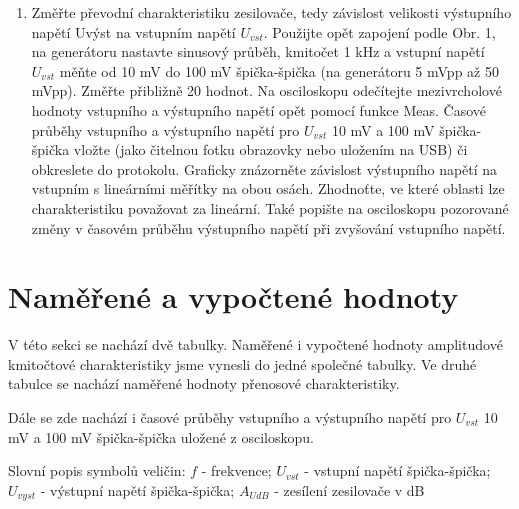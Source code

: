 \documentclass[a4paper, czech]{article}
\begin{document}
\begin{enumerate}
    \item Změřte převodní charakteristiku zesilovače, tedy závislost velikosti výstupního napětí Uvýst na vstupním napětí $U_{vst}$. Použijte opět zapojení podle Obr. 1, na generátoru nastavte sinusový průběh, kmitočet 1 kHz a vstupní napětí $U_{vst}$ měňte od 10 mV do 100 mV špička-špička (na generátoru 5 mVpp až 50 mVpp). Změřte přibližně 20 hodnot. Na osciloskopu odečítejte mezivrcholové hodnoty vstupního a výstupního napětí opět pomocí funkce Meas. Časové průběhy vstupního a výstupního napětí pro $U_{vst}$ 10 mV a 100 mV špička-špička vložte (jako čitelnou fotku obrazovky nebo uložením na USB) či obkreslete do protokolu. Graficky znázorněte závislost výstupního napětí na vstupním s lineárními měřítky na obou osách. Zhodnoťte, ve které oblasti lze charakteristiku považovat za lineární. Také popište na osciloskopu pozorované změny v časovém průběhu výstupního napětí při zvyšování vstupního napětí.
\end{enumerate}

\section{Naměřené a vypočtené hodnoty}

V této sekci se nachází dvě tabulky.
Naměřené i vypočtené hodnoty amplitudové kmitočtové charakteristiky jsme vynesli do jedné společné tabulky.
Ve druhé tabulce se nachází naměřené hodnoty přenosové charakteristiky.

Dále se zde nachází i časové průběhy vstupního a výstupního napětí pro $U_{vst}$ 10 mV a 100 mV špička-špička uložené z osciloskopu.

Slovní popis symbolů veličin:
$f$ - frekvence;
$U_{vst}$ - vstupní napětí špička-špička;
$U_{vyst}$ - výstupní napětí špička-špička;
$A_{UdB}$ - zesílení zesilovače v dB
\end{document}
